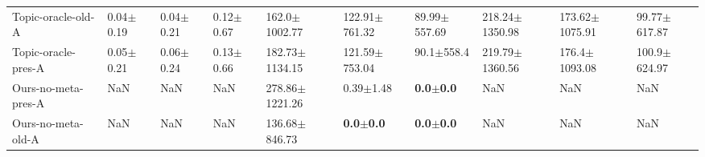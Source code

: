 \begin{tabular}{llllllllll}
Topic-oracle-old-A  &  0.04$\pm$0.19 &  0.04$\pm$0.21 &   0.12$\pm$0.67 &           162.0$\pm$1002.77 &     122.91$\pm$761.32 &      89.99$\pm$557.69 &  218.24$\pm$1350.98 &  173.62$\pm$1075.91 &   99.77$\pm$617.87 \\
Topic-oracle-pres-A &  0.05$\pm$0.21 &  0.06$\pm$0.24 &   0.13$\pm$0.66 &          182.73$\pm$1134.15 &     121.59$\pm$753.04 &        90.1$\pm$558.4 &  219.79$\pm$1360.56 &   176.4$\pm$1093.08 &   100.9$\pm$624.97 \\
Ours-no-meta-pres-A &            NaN &            NaN &             NaN &          278.86$\pm$1221.26 &         0.39$\pm$1.48 &  \textbf{0.0$\pm$0.0} &                 NaN &                 NaN &                NaN \\
Ours-no-meta-old-A  &            NaN &            NaN &             NaN &           136.68$\pm$846.73 &  \textbf{0.0$\pm$0.0} &  \textbf{0.0$\pm$0.0} &                 NaN &                 NaN &                NaN \\
\bottomrule
\end{tabular}
